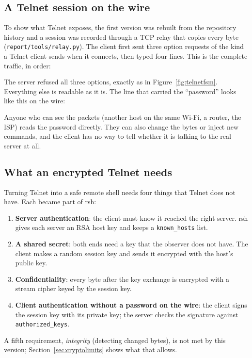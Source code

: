 \subsection{A Telnet session on the wire}
\label{sec:telnetwire}

To show what Telnet exposes, the first version was rebuilt from the repository
history and a session was recorded through a TCP relay that copies every byte
(\texttt{report/tools/relay.py}). The client first sent three option requests
of the kind a Telnet client sends when it connects, then typed four lines. This is the complete
traffic, in order:



The server refused all three options, exactly as in
Figure~\ref{fig:telnetfsm}. Everything else is readable as it is. The line
that carried the ``password'' looks like this on the wire:

\begin{table}[H]
\centering

\caption{The bytes of \texttt{echo my-password-123} as captured: each byte is the ASCII code of the character typed.}
\label{tab:telnetpw}
\end{table}

Anyone who can see the packets (another host on the same Wi-Fi, a router, the
ISP) reads the password directly. They can also change the bytes or inject new
commands, and the client has no way to tell whether it is talking to the real
server at all.

\subsection{What an encrypted Telnet needs}

Turning Telnet into a safe remote shell needs four things that Telnet does not
have. Each became part of rsh:

\begin{enumerate}
\item \textbf{Server authentication}: the client must know it reached the right
  server. rsh gives each server an RSA host key and keeps a
  \texttt{known\_hosts} list.
\item \textbf{A shared secret}: both ends need a key that the observer does not
  have. The client makes a random session key and sends it encrypted with the
  host's public key.
\item \textbf{Confidentiality}: every byte after the key exchange is encrypted
  with a stream cipher keyed by the session key.
\item \textbf{Client authentication without a password on the wire}: the client
  signs the session key with its private key; the server checks the signature
  against \texttt{authorized\_keys}.
\end{enumerate}

\noindent A fifth requirement, \emph{integrity} (detecting changed bytes), is
not met by this version; Section~\ref{sec:cryptolimits} shows what that allows.

